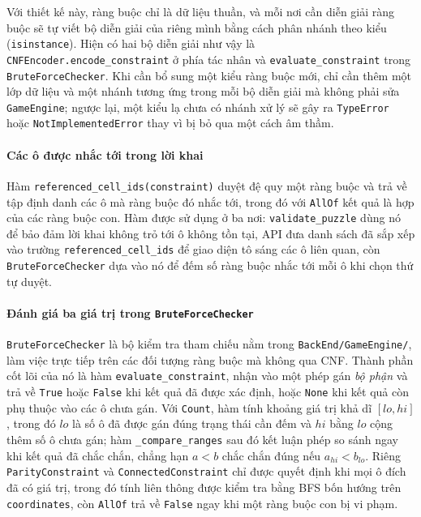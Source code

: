 \begin{sloppypar}
Với thiết kế này, ràng buộc chỉ là dữ liệu thuần, và mỗi nơi cần diễn giải ràng
buộc sẽ tự viết bộ diễn giải của riêng mình bằng cách phân nhánh theo kiểu
(\texttt{isinstance}). Hiện có hai bộ diễn giải như vậy là
\texttt{CNFEncoder.encode\_constraint} ở phía tác nhân và
\texttt{evaluate\_constraint} trong \texttt{BruteForceChecker}. Khi cần bổ sung
một kiểu ràng buộc mới, chỉ cần thêm một lớp dữ liệu và một nhánh tương ứng trong
mỗi bộ diễn giải mà không phải sửa \texttt{GameEngine}; ngược lại, một kiểu lạ
chưa có nhánh xử lý sẽ gây ra \texttt{TypeError} hoặc
\texttt{NotImplementedError} thay vì bị bỏ qua một cách âm thầm.

\paragraph{Các ô được nhắc tới trong lời khai}
Hàm \texttt{referenced\_cell\_ids(constraint)} duyệt đệ quy một ràng buộc và trả
về tập định danh các ô mà ràng buộc đó nhắc tới, trong đó với \texttt{AllOf}
kết quả là hợp của các ràng buộc con. Hàm được sử dụng ở ba nơi:
\texttt{validate\_puzzle} dùng nó để bảo đảm lời khai không trỏ tới ô không tồn
tại, API đưa danh sách đã sắp xếp vào trường \texttt{referenced\_cell\_ids} để
giao diện tô sáng các ô liên quan, còn \texttt{BruteForceChecker} dựa vào nó để
đếm số ràng buộc nhắc tới mỗi ô khi chọn thứ tự duyệt.

\paragraph{Đánh giá ba giá trị trong \texttt{BruteForceChecker}}
\texttt{BruteForceChecker} là bộ kiểm tra tham chiếu nằm trong
\nolinkurl{BackEnd/GameEngine/}, làm việc trực tiếp trên các đối tượng ràng buộc
mà không qua CNF. Thành phần cốt lõi của nó là hàm \texttt{evaluate\_constraint},
nhận vào một phép gán \emph{bộ phận} và trả về \texttt{True} hoặc \texttt{False}
khi kết quả đã được xác định, hoặc \texttt{None} khi kết quả còn phụ thuộc vào
các ô chưa gán. Với \texttt{Count}, hàm tính khoảng giá trị khả dĩ
$[\mathit{lo}, \mathit{hi}]$, trong đó $\mathit{lo}$ là số ô đã được gán đúng
trạng thái cần đếm và $\mathit{hi}$ bằng $\mathit{lo}$ cộng thêm số ô chưa gán;
hàm \texttt{\_compare\_ranges} sau đó kết luận phép so sánh ngay khi kết quả đã
chắc chắn, chẳng hạn $a < b$ chắc chắn đúng nếu $a_{\mathit{hi}} <
b_{\mathit{lo}}$. Riêng \texttt{ParityConstraint} và \texttt{ConnectedConstraint}
chỉ được quyết định khi mọi ô đích đã có giá trị, trong đó tính liên thông được
kiểm tra bằng BFS bốn hướng trên \texttt{coordinates}, còn \texttt{AllOf} trả về
\texttt{False} ngay khi một ràng buộc con bị vi phạm.


\end{sloppypar}
